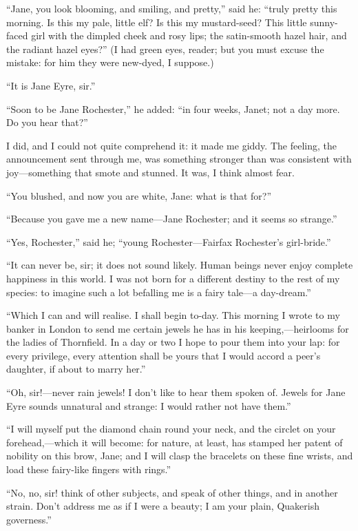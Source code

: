 \enquote{Jane, you look blooming, and smiling, and pretty,} said he:
\enquote{truly pretty this morning.  Is this my pale, little elf?  Is
this my mustard-seed?  This little sunny-faced girl with the dimpled
cheek and rosy lips; the satin-smooth hazel hair, and the radiant hazel
eyes?}  (I had green eyes, reader; but you must excuse the mistake: for
him they were new-dyed, I suppose.)

\enquote{It is Jane Eyre, sir.}

\enquote{Soon to be Jane Rochester,} he added: \enquote{in four weeks,
Janet; not a day more.  Do you hear that?}

I did, and I could not quite comprehend it: it made me giddy.  The
feeling, the announcement sent through me, was something stronger than
was consistent with joy---something that smote and stunned.  It was, I
think almost fear.

\enquote{You blushed, and now you are white, Jane: what is that for?}

\enquote{Because you gave me a new name---Jane Rochester; and it seems
so strange.}

\enquote{Yes, \Mrs{} Rochester,} said he; \enquote{young \Mrs{}
 Rochester---Fairfax Rochester's girl-bride.}

\enquote{It can never be, sir; it does not sound likely.  Human beings
never enjoy complete happiness in this world.  I was not born for a
different destiny to the rest of my species: to imagine such a lot
befalling me is a fairy tale---a day-dream.}

\enquote{Which I can and will realise.  I shall begin to-day.  This
morning I wrote to my banker in London to send me certain jewels he has
in his keeping,---heirlooms for the ladies of Thornfield.  In a day or
two I hope to pour them into your lap: for every privilege, every
attention shall be yours that I would accord a peer's daughter, if about
to marry her.}

\enquote{Oh, sir!---never rain jewels!  I don't like to hear them spoken
of.  Jewels for Jane Eyre sounds unnatural and strange: I would rather
not have them.}

\enquote{I will myself put the diamond chain round your neck, and the
circlet on your forehead,---which it will become: for nature, at least,
has stamped her patent of nobility on this brow, Jane; and I will clasp
the bracelets on these fine wrists, and load these fairy-like fingers
with rings.}

\enquote{No, no, sir! think of other subjects, and speak of other
things, and in another strain.  Don't address me as if I were a beauty;
I am your plain, Quakerish governess.}

